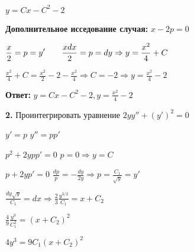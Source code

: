 \documentclass[a4paper]{article}
\begin{document}
\vspace{0.3cm}

$\displaystyle y=Cx-C^2-2$

\vspace{0.3cm}

\textbf{Дополнительное исседование случая:} $\displaystyle x-2p=0$

\vspace{0.3cm}

$\displaystyle \frac{x}{2}=p=y'\hspace{0.7cm} \frac{xdx}{2}=p=dy \Rightarrow y=\frac{x^2}{4}+C$

\vspace{0.3cm}

$\displaystyle \frac{x^2}{4}+C=\frac{x^2}{2} -2-\frac{x^2}{4} \Rightarrow C=-2 \Rightarrow y=\frac{x^2}{4}-2$


\textbf{Ответ: } $\displaystyle y=Cx-C^2-2, y=\frac{x^2}{4}-2$

\vspace{1cm}

\textbf{2.} Проинтегрировать уравнение $\displaystyle 2yy''+(y')^2=0$

\vspace{0.3cm}

$\displaystyle y'=p$ \hspace{1cm} $\displaystyle y''=pp'$

\vspace{0.3cm}

$\displaystyle p^2+2ypp'=0$ \hspace{1cm} $\displaystyle p=0 \Rightarrow y=C$

\vspace{0.3cm}

$\displaystyle p+2yp'=0$ \hspace{1cm} $ \displaystyle \frac{dp}{p}=-\frac{dy}{2y} \Rightarrow p=\frac{C_1}{\sqrt{y}}=y'$

\vspace{0.3cm}

$\displaystyle \frac{dy \sqrt{y}}{C_1}=dx \Rightarrow \frac{2}{3}\frac{y^{3/2}}{C_1}=x+C_2$

\vspace{0.3cm}

$\displaystyle \frac{4}{9}\frac{y^{3}}{C_1^2}=(x+C_2)^2$

\vspace{0.3cm}

$\displaystyle 4y^3=9C_1(x+C_2)^2$

\vspace{0.3cm}
\end{document}
